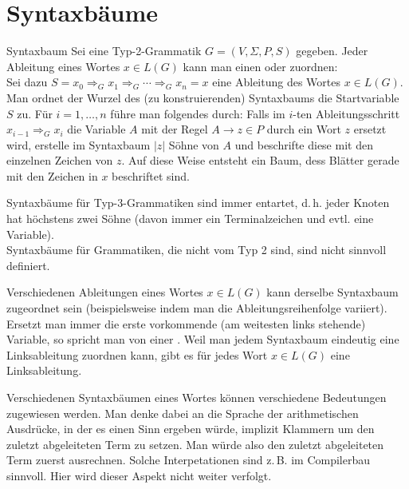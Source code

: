 \pagebreak

\section{%
    Syntaxbäume%
}

\begin{Def}{Syntaxbaum}
    Sei eine Typ-2-Grammatik $G = (V, \Sigma, P, S)$ gegeben.
    Jeder Ableitung eines Wortes $x \in L(G)$ kann man einen
     oder  zuordnen:\\
    Sei dazu $S = x_0 \Rightarrow_G x_1 \Rightarrow_G \dotsb
    \Rightarrow_G x_n = x$ eine Ableitung des Wortes $x \in L(G)$.
    Man ordnet der Wurzel des (zu konstruierenden) Syntaxbaums die
    Startvariable $S$ zu.
    Für $i = 1, \dotsc, n$ führe man folgendes durch:
    Falls im $i$-ten Ableitungsschritt $x_{i-1} \Rightarrow_G x_i$
    die Variable $A$ mit der Regel $A \rightarrow z \in P$ durch ein Wort $z$
    ersetzt wird, erstelle im Syntaxbaum $|z|$ Söhne von $A$ und beschrifte
    diese mit den einzelnen Zeichen von $z$.
    Auf diese Weise entsteht ein Baum, dess Blätter gerade mit den Zeichen in
    $x$ beschriftet sind.
\end{Def}

\begin{Bem}
    Syntaxbäume für Typ-3-Grammatiken sind immer entartet, d.\,h.
    jeder Knoten hat höchstens zwei Söhne (davon immer ein Terminalzeichen und
    evtl. eine Variable).\\
    Syntaxbäume für Grammatiken, die nicht vom Typ 2 sind, sind nicht sinnvoll
    definiert.
\end{Bem}

\begin{Bem}
    Verschiedenen Ableitungen eines Wortes $x \in L(G)$ kann derselbe
    Syntaxbaum zugeordnet sein
    (beispielsweise indem man die Ableitungsreihenfolge variiert).
    Ersetzt man immer die erste vorkommende (am weitesten links stehende)
    Variable, so spricht man von einer .
    Weil man jedem Syntaxbaum eindeutig eine Linksableitung zuordnen kann,
    gibt es für jedes Wort $x \in L(G)$ eine Linksableitung.
\end{Bem}

\begin{Bem}
    Verschiedenen Syntaxbäumen eines Wortes können verschiedene Bedeutungen
    zugewiesen werden.
    Man denke dabei an die Sprache der arithmetischen Ausdrücke, in der es
    einen Sinn ergeben würde, implizit Klammern um den zuletzt abgeleiteten
    Term zu setzen.
    Man würde also den zuletzt abgeleiteten Term zuerst ausrechnen.
    Solche Interpetationen sind z.\,B. im Compilerbau sinnvoll.
    Hier wird dieser Aspekt nicht weiter verfolgt.
\end{Bem}


